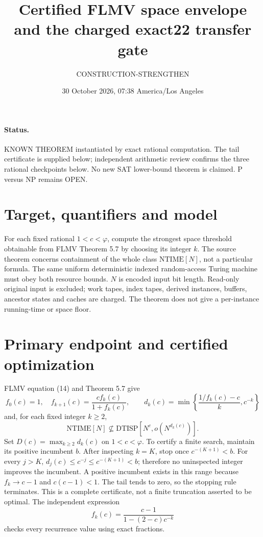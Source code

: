 \documentclass[11pt]{article}
\title{Certified FLMV space envelope and the charged exact22 transfer gate}
\author{CONSTRUCTION-STRENGTHEN}
\date{30 October 2026, 07:38 America/Los Angeles}
\begin{document}
\maketitle
\paragraph{Status.} KNOWN THEOREM instantiated by exact rational computation.
The tail certificate is supplied below; independent arithmetic review confirms the three rational checkpoints below.
No new SAT lower-bound theorem is claimed. P versus NP remains OPEN.

\section{Target, quantifiers and model}
For each fixed rational $1<c<\varphi$, compute the strongest space
threshold obtainable from FLMV Theorem 5.7 by choosing its integer $k$.
The source theorem concerns containment of the whole class
$\mathrm{NTIME}[N]$, not a particular formula.
The same uniform deterministic indexed random-access Turing machine must
obey both resource bounds. $N$ is encoded input bit length.
Read-only original input is excluded; work tapes, index tapes, derived
instances, buffers, ancestor states and caches are charged.
The theorem does not give a per-instance running-time or space floor.

\section{Primary endpoint and certified optimization}
FLMV equation (14) and Theorem 5.7 give
\[
 f_0(c)=1,\quad f_{k+1}(c)=\frac{cf_k(c)}{1+f_k(c)},\qquad
 d_k(c)=\min\left\{\frac{1/f_k(c)-c}{k},c^{-k}\right\}
\]
and, for each fixed integer $k\ge2$,
\[
 \mathrm{NTIME}[N]\not\subseteq
 \mathrm{DTISP}[N^c,o(N^{d_k(c)})].
\]
Set $D(c)=\max_{k\ge2}d_k(c)$ on $1<c<\varphi$.
To certify a finite search, maintain its positive incumbent $b$.
After inspecting $k=K$, stop once $c^{-(K+1)}<b$.
For every $j>K$, $d_j(c)\le c^{-j}\le c^{-(K+1)}<b$;
therefore no uninspected integer improves the incumbent.
A positive incumbent exists in this range because
$f_k\to c-1$ and $c(c-1)<1$. The tail tends to zero, so
the stopping rule terminates. This is a complete certificate, not a
finite truncation asserted to be optimal.
The independent expression
\[
 f_k(c)=\frac{c-1}{1-(2-c)c^{-k}}
\]
checks every recurrence value using exact fractions.
\end{document}
